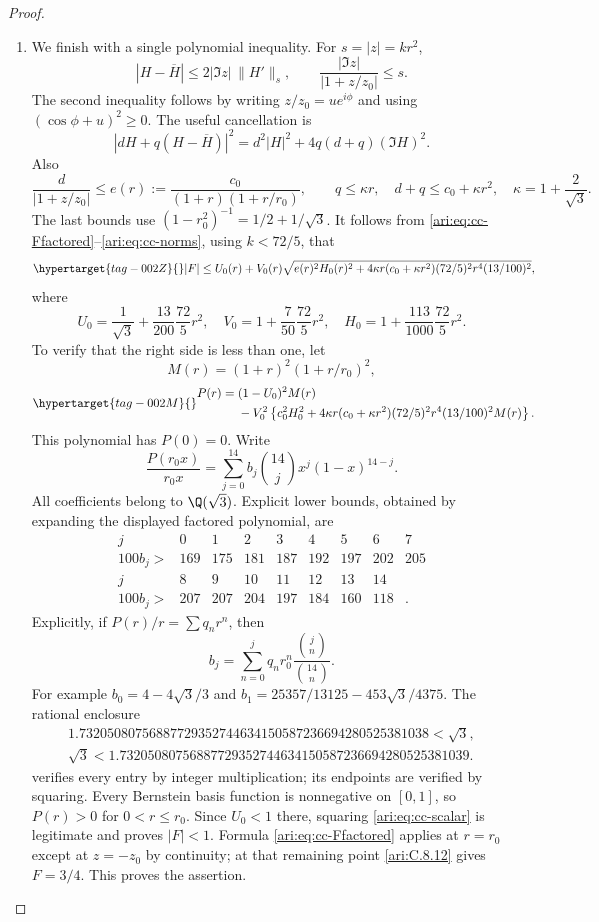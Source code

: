 \begin{proof}
\begin{enumerate}[label=\arabic*.,leftmargin=*]
\item We finish with a single polynomial inequality. For $s=|z|=kr^2$,
\[
 |H-\overline H|\le2|\Im z|\,\|H'\|_s,\qquad
 \frac{|\Im z|}{|1+z/z_0|}\le s.
\]
The second inequality follows by writing $z/z_0=ue^{i\phi}$
and using $(\cos\phi+u)^2\ge0$. The useful cancellation is
\[
 |dH+q(H-\overline H)|^2
      =d^2|H|^2+4q(d+q)(\Im H)^2.
\]
Also
\[
 \frac d{|1+z/z_0|}\le
 e(r):=\frac{c_0}{(1+r)(1+r/r_0)},\qquad
 q\le\kappa r,\quad d+q\le c_0+\kappa r^2,
 \quad\kappa=1+\frac2{\sqrt3}.
\]
The last bounds use $(1-r_0^2)^{-1}=1/2+1/\sqrt3$.
It follows from \eqref{ari:eq:cc-Ffactored}--\eqref{ari:eq:cc-norms},
using $k<72/5$, that
\begin{equation}\hypertarget{tag-002Z}{}\label{ari:eq:cc-scalar}
 |F|\le U_0(r)+V_0(r)
 \sqrt{e(r)^2H_0(r)^2+
       4\kappa r(c_0+\kappa r^2)(72/5)^2r^4(13/100)^2},
\end{equation}
where
\[
 U_0=\frac1{\sqrt3}+\frac{13}{200}\frac{72}{5}r^2,
 \quad V_0=1+\frac7{50}\frac{72}{5}r^2,
 \quad H_0=1+\frac{113}{1000}\frac{72}{5}r^2.
\]
To verify that the right side is less than one, let
\[
 M(r)=(1+r)^2(1+r/r_0)^2,
\]
\begin{equation}\hypertarget{tag-002M}{}\label{ari:eq:cc-P}
 \begin{aligned}
 P(r)={}&(1-U_0)^2M(r)\\
 &-V_0^2\left\{c_0^2H_0^2+
 4\kappa r(c_0+\kappa r^2)(72/5)^2r^4(13/100)^2M(r)\right\}.
 \end{aligned}
\end{equation}
This polynomial has $P(0)=0$. Write
\[
 \frac{P(r_0x)}{r_0x}
     =\sum_{j=0}^{14}b_j\binom{14}{j}x^j(1-x)^{14-j}.
\]
All coefficients belong to $\Q(\sqrt3)$. Explicit lower bounds,
obtained by expanding the displayed factored polynomial, are
\[
 \begin{array}{c|rrrrrrrr}
 j&0&1&2&3&4&5&6&7\\ \hline
 100b_j>&169&175&181&187&192&197&202&205\\[2pt]
 j&8&9&10&11&12&13&14&\\ \hline
 100b_j>&207&207&204&197&184&160&118&.
 \end{array}
\]
Explicitly, if $P(r)/r=\sum q_nr^n$,
then
\[
 b_j=\sum_{n=0}^j q_nr_0^n
                  \frac{\binom jn}{\binom{14}n}.
\]
For example $b_0=4-4\sqrt3/3$ and
$b_1=25357/13125-453\sqrt3/4375$. The rational enclosure
\[
 \begin{gathered}
 1.73205080756887729352744634150587236694280525381038<\sqrt3,\\
 \sqrt3<1.73205080756887729352744634150587236694280525381039.
 \end{gathered}
\]
verifies every entry by integer multiplication; its endpoints
are verified by squaring. Every Bernstein basis function is
nonnegative on $[0,1]$, so $P(r)>0$ for $0<r\le r_0$.
Since $U_0<1$ there, squaring \eqref{ari:eq:cc-scalar} is legitimate
and proves $|F|<1$. Formula \eqref{ari:eq:cc-Ffactored} applies
at $r=r_0$ except at $z=-z_0$ by continuity; at that remaining
point \ref{ari:C.8.12} gives $F=3/4$. This proves the assertion.
\end{enumerate}
\end{proof}